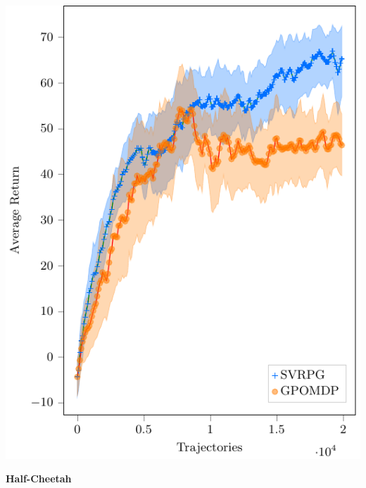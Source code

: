 \documentclass[aspectratio=169]{beamer}
\begin{document}
\begin{frame}
\begin{minipage}[t]{.28\paperwidth}
\includegraphics[width=\textwidth]{images/swimmer.pdf}
\end{minipage}
%
\begin{minipage}[t]{.28\paperwidth}
\begin{center}
	\textbf{Half-Cheetah}
\end{center}

\end{minipage}
\end{frame}
\end{document}
